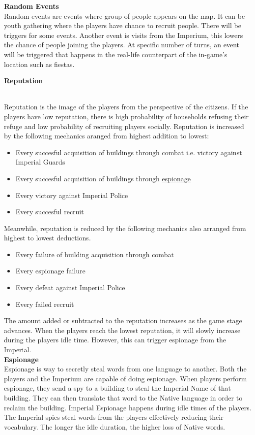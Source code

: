 \documentclass[11pt]{article}
\begin{document}
\textbf{Random Events}\\
Random events are events where group of people appears on the map. It can be youth gathering where the players have chance to recruit people. There will be triggers for some events. Another event is visits from the Imperium, this lowers the chance of people joining the players.
At specific number of turns, an event will be triggered that happens in the real-life counterpart of the in-game's location such as fiestas.

\hypertarget{reputation}{\textbf{Reputation}}\\
Reputation is the image of the players from the perspective of the citizens. If the players have low reputation, there is high probability of households refusing their refuge and low probability of recruiting players socially.
Reputation is increased by the following mechanics aranged from highest addition to lowest:
\begin{itemize}
\item
  Every succesful acquisition of buildings through combat i.e. victory against Imperial Guards 
\item
  Every succesful acquisition of buildings through \hyperlink{espionage}{espionage}
\item
  Every victory against Imperial Police
\item
  Every succesful recruit
\end{itemize}
Meanwhile, reputation is reduced by the following mechanics also arranged from highest to lowest deductions.
\begin{itemize}
\item
  Every failure of building acquisition through combat
\item
  Every espionage failure
\item
  Every defeat against Imperial Police
\item
  Every failed recruit
\end{itemize}
The amount added or subtracted to the reputation increases as the game stage advances. When the players reach the lowest reputation, it will slowly increase during the players idle time. However, this can trigger espionage from the Imperial.\\

\hypertarget{espionage}{\textbf{Espionage}}\\
Espionage is way to secretly steal words from one language to another. Both the players and the Imperium are capable of doing espionage. When players perform espionage, they send a spy to a building to steal the Imperial Name of that building. They can then translate that word to the Native language in order to reclaim the building. Imperial Espionage happens during idle times of the players. The Imperial spies steal words from the players effectively reducing their vocabulary. The longer the idle duration, the higher loss of Native words.\\
\end{document}

